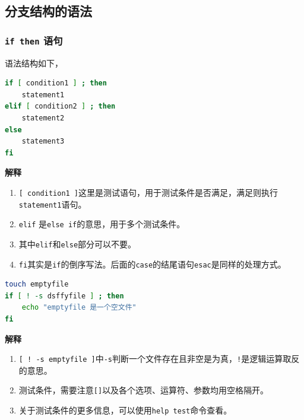 \documentclass[doctor,openright,twoside]{sjtuthesis}
\providecommand{\tightlist}{%
    \setlength{\itemsep}{0pt}\setlength{\parskip}{0pt}}
\newcommand{\passthrough}[1]{#1}
\theoremstyle{plain}
\theoremstyle{definition}
\theoremstyle{remark}
\theoremstyle{ocrenumbox}
\theoremstyle{plain}
\begin{document}
\subsection{分支结构的语法}

\hypertarget{if-then-}{%
\subsubsection{\texorpdfstring{\texttt{if\ then}
语句}{if then 语句}}\label{if-then-}}

语法结构如下，

\begin{lstlisting}[language=bash]
if [ condition1 ] ; then
    statement1
elif [ condition2 ] ; then
    statement2
else
    statement3
fi
\end{lstlisting}

\textbf{解释}

\begin{enumerate}
\def\labelenumi{\arabic{enumi}.}
\tightlist
\item
  \passthrough{\lstinline![ condition1 ]!}这里是测试语句，用于测试条件是否满足，满足则执行\passthrough{\lstinline!statement1!}语句。
\item
  \passthrough{\lstinline!elif!}
  是\passthrough{\lstinline!else if!}的意思，用于多个测试条件。
\item
  其中\passthrough{\lstinline!elif!}和\passthrough{\lstinline!else!}部分可以不要。
\item
  \passthrough{\lstinline!fi!}其实是\passthrough{\lstinline!if!}的倒序写法。后面的\passthrough{\lstinline!case!}的结尾语句\passthrough{\lstinline!esac!}是同样的处理方式。
\end{enumerate}

\begin{lstlisting}[language=bash]
touch emptyfile
if [ ! -s dsffyfile ] ; then
    echo "emptyfile 是一个空文件"
fi
\end{lstlisting}

\textbf{解释}

\begin{enumerate}
\def\labelenumi{\arabic{enumi}.}
\tightlist
\item
  \passthrough{\lstinline"[ ! -s emptyfile ]"}中\passthrough{\lstinline!-s!}判断一个文件存在且非空是为真，\passthrough{\lstinline"!"}是逻辑运算取反的意思。
\item
  测试条件，需要注意\passthrough{\lstinline![]!}以及各个选项、运算符、参数均用空格\passthrough{\lstinline!!}隔开。
\item
  关于测试条件的更多信息，可以使用\passthrough{\lstinline!help test!}命令查看。
\end{enumerate}
\end{document}
